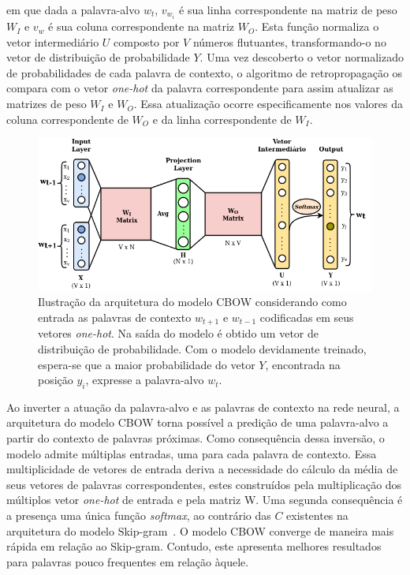 \documentclass{SBCbookchapter}
\begin{document}
\noindent em que dada a palavra-alvo $w_t$, $v_{w_i}$ é sua linha correspondente na matriz de peso $W_{I}$ e $v_{w}$ é sua coluna correspondente na matriz $W_{O}$. Esta função normaliza o vetor intermediário $U$ composto por $V$ números flutuantes, transformando-o no vetor de distribuição de probabilidade $Y$. %
Uma vez descoberto o vetor normalizado de probabilidades de cada palavra de contexto, o algoritmo de retropropagação os compara com o vetor \textit{one-hot} da palavra correspondente para assim atualizar as matrizes de peso $W_{I}$ e $W_{O}$. Essa atualização ocorre especificamente nos valores da coluna correspondente de $W_{O}$ e da linha correspondente de $W_{I}$.

\begin{figure}[h]
	\centering
	\includegraphics[width=1\columnwidth]{cbow.png}
	\caption{Ilustração da arquitetura do modelo CBOW considerando como entrada as palavras de contexto $w_{t+1}$ e $w_{t-1}$ codificadas em seus vetores \textit{one-hot}. Na saída do modelo é obtido um vetor de distribuição de probabilidade. Com o modelo devidamente treinado, espera-se que a maior probabilidade do vetor $Y$, encontrada na posição $y_i$, expresse a palavra-alvo $w_{t}$.}
	\label{fig:cbow}
\end{figure}

Ao inverter a atuação da palavra-alvo e as palavras de contexto na rede neural, a arquitetura do modelo CBOW torna possível a predição de uma palavra-alvo a partir do contexto de palavras próximas. Como consequência dessa inversão, o modelo admite múltiplas entradas, uma para cada palavra de contexto. Essa multiplicidade de vetores de entrada deriva a necessidade do cálculo da média de seus vetores de palavras correspondentes, estes construídos pela multiplicação dos múltiplos vetor \textit{one-hot} de entrada e pela matriz W. Uma segunda consequência é a presença uma única função \textit{softmax}, ao contrário das $C$ existentes na arquitetura do modelo Skip-gram~\cite{hu2016novel}.
O modelo CBOW converge de maneira mais rápida em relação ao Skip-gram. Contudo, este apresenta melhores resultados para palavras pouco frequentes em relação àquele. 
\end{document}

